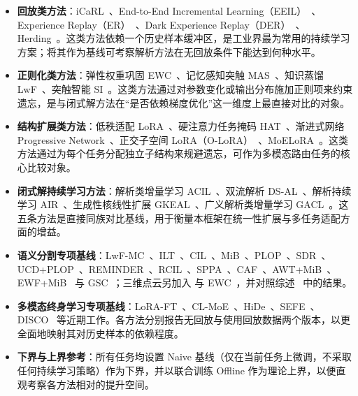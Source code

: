\begin{itemize}
    \item \textbf{回放类方法}：iCaRL~\citep{rebuffi2017icarl}、End-to-End Incremental Learning（EEIL）~\citep{castro2018end}、Experience Replay（ER）~\citep{rolnick2019experience}、Dark Experience Replay（DER）~\citep{buzzega2020dark}、Herding~\citep{welling2009herding}。这类方法依赖一个历史样本缓冲区，是工业界最为常用的持续学习方案；将其作为基线可考察解析方法在无回放条件下能达到何种水平。
    \item \textbf{正则化类方法}：弹性权重巩固 EWC~\citep{kirkpatrick2017ewc}、记忆感知突触 MAS~\citep{aljundi2018memory}、知识蒸馏 LwF~\citep{li2017learning}、突触智能 SI~\citep{zenke2017continual}。这类方法通过对参数变化或输出分布施加正则项来约束遗忘，是与闭式解方法在“是否依赖梯度优化”这一维度上最直接对比的对象。
    \item \textbf{结构扩展类方法}：低秩适配 LoRA~\citep{hu2021lora}、硬注意力任务掩码 HAT~\citep{serra2018hat}、渐进式网络 Progressive Network~\citep{rusu2016progressive}、正交子空间 LoRA（O-LoRA）~\citep{wang2023orthogonal}、MoELoRA~\citep{chen2024coin}。这类方法通过为每个任务分配独立子结构来规避遗忘，可作为多模态路由任务的核心比较对象。
    \item \textbf{闭式解持续学习方法}：解析类增量学习 ACIL~\citep{zhuang2022acil}、双流解析 DS-AL~\citep{zhuang2024dsal}、解析持续学习 AIR~\citep{fang2024air}、生成性核线性扩展 GKEAL~\citep{GKEAL_Zhuang_CVPR2023}、广义解析类增量学习 GACL~\citep{GACL_Zhuang_NeurIPS2024}。这五条方法是直接同族对比基线，用于衡量本框架在统一性扩展与多任务适配方面的增益。
    \item \textbf{语义分割专项基线}：LwF-MC~\citep{rebuffi2017icarl}、ILT~\citep{ILT}、CIL~\citep{CIL}、MiB~\citep{cermelli2020mib}、PLOP~\citep{douillard2021plop}、SDR~\citep{SDR}、UCD+PLOP~\citep{UCD}、REMINDER~\citep{REMINDER}、RCIL~\citep{RCIL}、SPPA~\citep{SPPA}、CAF~\citep{CAF}、AWT+MiB~\citep{AWT}、EWF+MiB~\citep{EWF} 与 GSC~\citep{GSC}；三维点云另加入 \citet{Yang3D} 与 EWC~\citep{kirkpatrick2017ewc}，并对照综述~\citep{CSSsurvey} 中的结果。
    \item \textbf{多模态终身学习专项基线}：LoRA-FT~\citep{hu2021lora}、CL-MoE~\citep{huai2025cl}、HiDe~\citep{guo2025hide}、SEFE~\citep{chen2025sefe}、DISCO~\citep{guo2025federated} 等近期工作。各方法分别报告无回放与使用回放数据两个版本，以更全面地映射其对历史样本的依赖程度。
    \item \textbf{下界与上界参考}：所有任务均设置 Naive 基线（仅在当前任务上微调，不采取任何持续学习策略）作为下界，并以联合训练 Offline 作为理论上界，以便直观考察各方法相对的提升空间。
\end{itemize}

